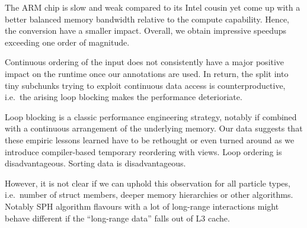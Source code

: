 The ARM chip is slow and weak compared to its Intel cousin yet come up with a better balanced memory bandwidth relative to the compute capability.
Hence, the conversion have a smaller impact.
Overall, we obtain impressive speedups exceeding one order of magnitude.


\begin{observation}
 Continuous ordering of the input does not consistently have a major positive impact on the runtime once our annotations are used. In return, the split into tiny subchunks trying to exploit continuous data access is counterproductive, i.e.~the arising loop blocking makes the performance deterioriate. 
\end{observation}



%
%
\noindent
Loop blocking is a classic performance engineering strategy, notably if combined with a continuous arrangement of the underlying memory.
Our data suggests that these empiric lessons learned have to be rethought or even turned around as we introduce compiler-based temporary reordering with views.
Loop ordering is disadvantageous.
Sorting data is disadvantageous.


However, it is not clear if we can uphold this observation for all particle types, i.e.~number of struct members, deeper memory hierarchies or other algorithms.
Notably SPH algorithm flavours with a lot of long-range interactions might behave different if the ``long-range data'' falls out of L3 cache. 

